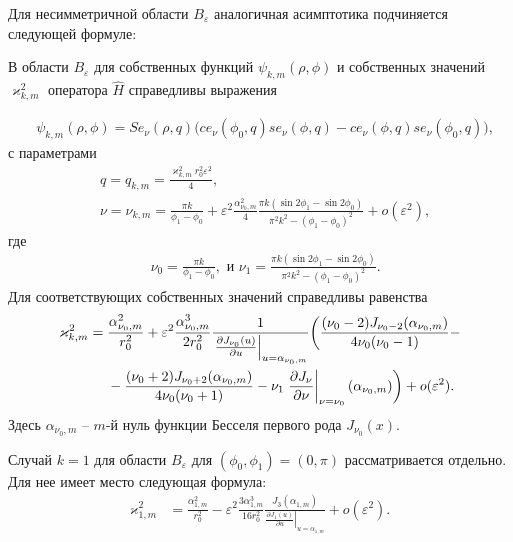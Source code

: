 Для несимметричной области $B_\varepsilon$  аналогичная асимптотика подчиняется следующей формуле:
\begin{theorem}
В области  $B_\varepsilon$ для собственных функций $\psi_{k, m}(\rho, \phi)$ и собственных значений $\varkappa^2_{k, m}$ оператора $\hat{H}$ справедливы выражения

\begin{align}
&\psi_{k, m}(\rho, \phi) = 
    Se_\nu(\rho, q) \biggl( ce_\nu(\phi_0, q) se_\nu(\phi, q) -ce_\nu(\phi, q) se_\nu(\phi_0, q) \biggr) ,  \label{eq:funB}
\end{align}
с параметрами
\begin{align*}    
    & q=q_{k,m} = \frac{\varkappa_{k,m}^2 r_0^2 \varepsilon^2}{4}, \\ 
&\nu = \nu_{k,m} = \frac{\pi k}{\phi_1-\phi_0} +\varepsilon^2 \frac{\alpha_{\nu_0, m}^2}{4} \frac{\pi k (\sin 2\phi_1 - \sin 2 \phi_0)}{\pi^2k^2-(\phi_1-\phi_0)^2} + o(\varepsilon^2) ,  
\end{align*}
где
\begin{align*}
& \nu_0 = \frac{\pi k}{\phi_1-\phi_0},\text{\ \ и \ \ }
\nu_1= \frac{\pi k (\sin 2\phi_1 - \sin 2 \phi_0)}{\pi^2k^2-(\phi_1-\phi_0)^2} .
\end{align*}
Для соответствующих собственных значений справедливы равенства
\begin{align}
\varkappa_{k, m}^2 ={}& \frac{\alpha_{\nu_0, m}^2}{r_0^2} +  \varepsilon^2 \frac{\alpha_{\nu_0, m}^3}{2 r_0^2}\frac{1}{ \left.\frac{\partial J_{\nu_0}(u)}{\partial u}\right|_{u=\alpha_{\nu_0, m}} }  
 \biggl(\frac{(\nu_0 - 2)J_{\nu_0-2}(\alpha_{\nu_0, m})   }{4\nu_0 (\nu_0-1)} -
\notag \\ 
&{}- \frac{(\nu_0 + 2)J_{\nu_0+2}(\alpha_{\nu_0, m})}{4\nu_0 (\nu_0+1)} 
- \nu_1 \left.\frac{\partial J_\nu}{\partial \nu}\right|_{\nu = \nu_0}(\alpha_{\nu_0, m})
    \biggr) + o(\varepsilon^2).\label{eq:valB}
\end{align}
Здесь $\alpha_{\nu_0,m}$ -- $m$-й нуль функции Бесселя первого рода $J_{\nu_0}(x)$.
\end{theorem}

Случай $k=1$ для области $B_\varepsilon$ для $(\phi_0, \phi_1)=(0,\pi)$  рассматривается отдельно. Для нее имеет место следующая формула:
\begin{align}
    \varkappa_{1, m}^2& = \frac{\alpha_{1, m}^2}{r_0^2} - \varepsilon^2 \frac{3\alpha_{1, m}^3}{16r_0^2} 
    \frac{J_3(\alpha_{1, m})}{\left.\frac{\partial J_1 (u)}{\partial u}\right|_{u=\alpha_{1, m}}} 
    + o(\varepsilon^2).  \label{eq:valS2}
\end{align}

